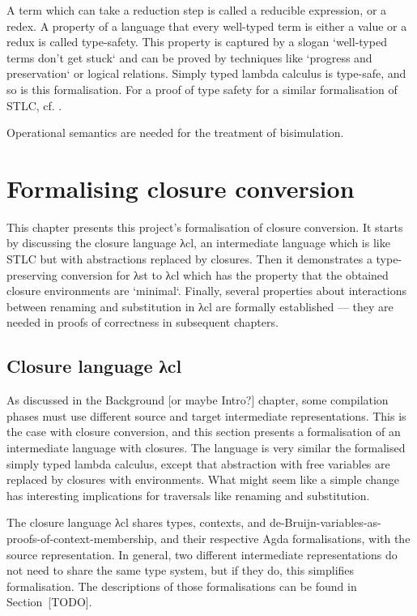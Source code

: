 \documentclass[bsc,frontabs,oneside,singlespacing,parskip,deptreport]{infthesis}
\theoremstyle{definition}
\theoremstyle{lemma}
\begin{document}

A term which can take a reduction step is called a reducible
expression, or a redex. A property of a language that every well-typed
term is either a value or a redux is called type-safety. This property
is captured by a slogan `well-typed terms don't get stuck` and can be
proved by techniques like `progress and preservation` or logical
relations. Simply typed lambda calculus is type-safe, and so is this
formalisation. For a proof of type safety for a similar formalisation
of STLC, cf. \cite{DBLP:conf/sbmf/Wadler18}.

Operational semantics are needed for the treatment of bisimulation.

\chapter{Formalising closure conversion}
\label{cha:agda-development}

This chapter presents this project's formalisation of closure
conversion. It starts by discussing the closure language λcl, an
intermediate language which is like STLC but with abstractions
replaced by closures. Then it demonstrates a type-preserving
conversion for λst to λcl which has the property that the obtained
closure environments are `minimal`.  Finally, several properties about
interactions between renaming and substitution in λcl are formally
established --- they are needed in proofs of correctness in subsequent
chapters.

\section{Closure language λcl}
\label{sec:closure-language-cl}

As discussed in the Background [or maybe Intro?] chapter, some
compilation phases must use different source and target intermediate
representations. This is the case with closure conversion, and this
section presents a formalisation of an intermediate language with
closures. The language is very similar the formalised simply typed
lambda calculus, except that abstraction with free variables are
replaced by closures with environments. What might seem like a simple
change has interesting implications for traversals like renaming and
substitution.

The closure language λcl shares types, contexts, and
de-Bruijn-variables-as-proofs-of-context-membership, and their
respective Agda formalisations, with the source representation. In
general, two different intermediate representations do not need to
share the same type system, but if they do, this simplifies
formalisation. The descriptions of those formalisations can be found
in Section~[TODO].
\end{document}
